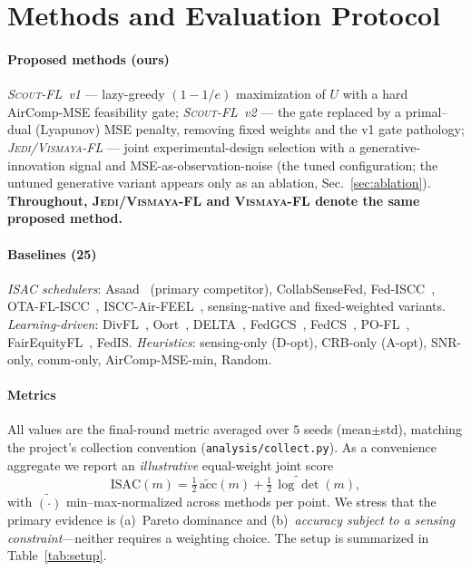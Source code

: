 \documentclass[journal,onecolumn,11pt]{IEEEtran}
\newcommand{\jedi}{\textsc{Jedi/Vismaya-FL}}
\newcommand{\scout}{\textsc{Scout-FL}}
\begin{document}
\section{Methods and Evaluation Protocol}
\paragraph{Proposed methods (ours)}
\emph{\scout{}~v1} --- lazy-greedy $(1{-}1/e)$ maximization of $U$ with a hard AirComp-MSE
feasibility gate; \emph{\scout{}~v2} --- the gate replaced by a primal--dual (Lyapunov)
MSE penalty, removing fixed weights and the v1 gate pathology; \emph{\jedi{}} --- joint
experimental-design selection with a generative-innovation signal and MSE-as-observation-noise
(the tuned configuration; the untuned generative variant appears only as an ablation,
Sec.~\ref{sec:ablation}). \textbf{Throughout, \jedi{} and \textsc{Vismaya}-FL denote the
same proposed method.}

\paragraph{Baselines (25)} \emph{ISAC schedulers}: Asaad~\cite{asaad2025} (primary
competitor), CollabSenseFed, Fed-ISCC~\cite{fediscc2024},
OTA-FL-ISCC~\cite{otafliscc2024}, ISCC-Air-FEEL~\cite{iscairfeel2025}, sensing-native and
fixed-weighted variants. \emph{Learning-driven}: DivFL~\cite{divfl2022}, Oort~\cite{oort2021},
DELTA~\cite{delta2023}, FedGCS~\cite{fedgcs2024}, FedCS~\cite{fedcs2019},
PO-FL~\cite{pofl2023}, FairEquityFL~\cite{fairequity2025}, FedIS. \emph{Heuristics}:
sensing-only (D-opt), CRB-only (A-opt), SNR-only, comm-only, AirComp-MSE-min, Random.

\paragraph{Metrics} All values are the final-round metric averaged over $5$ seeds
(mean$\pm$std), matching the project's collection convention (\texttt{analysis/collect.py}).
As a convenience aggregate we report an \emph{illustrative} equal-weight joint score
\begin{equation}
\mathrm{ISAC}(m)=\tfrac12\,\widetilde{\mathrm{acc}}(m)+\tfrac12\,\widetilde{\log\!\det}(m),
\label{eq:isac}
\end{equation}
with $\widetilde{(\cdot)}$ min--max-normalized across methods per point. We stress that
the primary evidence is (a)~Pareto dominance and (b)~\emph{accuracy subject to a sensing
constraint}---neither requires a weighting choice. The setup is summarized in
Table~\ref{tab:setup}.
\end{document}
